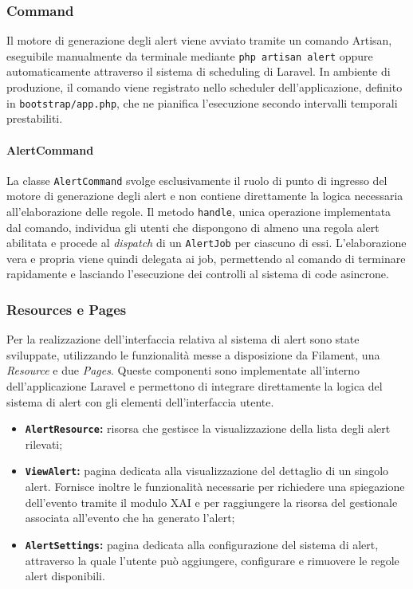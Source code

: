 \subsubsection{Command}
Il motore di generazione degli alert viene avviato tramite un comando Artisan, eseguibile manualmente da terminale mediante \texttt{php artisan alert} oppure 
automaticamente attraverso il sistema di scheduling di Laravel. In ambiente di produzione, il comando viene registrato nello scheduler dell'applicazione, definito in 
\texttt{bootstrap/app.php}, che ne pianifica l'esecuzione secondo intervalli temporali prestabiliti.

\paragraph{AlertCommand}
La classe \texttt{AlertCommand} svolge esclusivamente il ruolo di punto di ingresso del motore di generazione degli alert e non contiene direttamente la logica 
necessaria all'elaborazione delle regole.
\newline
Il metodo \texttt{handle}, unica operazione implementata dal comando, individua gli utenti che dispongono di almeno una regola alert abilitata e procede al \textit{dispatch} di 
un \texttt{AlertJob} per ciascuno di essi. L'elaborazione vera e propria viene quindi delegata ai job, permettendo al comando di terminare rapidamente e lasciando l'esecuzione 
dei controlli al sistema di code asincrone.

\subsubsection{Resources e Pages}
Per la realizzazione dell'interfaccia relativa al sistema di alert sono state sviluppate, utilizzando le funzionalità messe a disposizione da Filament, una 
\textit{Resource} e due \textit{Pages}. Queste componenti sono implementate all'interno dell'applicazione Laravel e permettono di integrare direttamente la logica del 
sistema di alert con gli elementi dell'interfaccia utente.
\begin{itemize}
  \item \textbf{\texttt{AlertResource}:} risorsa che gestisce la visualizzazione della lista degli alert rilevati;
  \item \textbf{\texttt{ViewAlert}:} pagina dedicata alla visualizzazione del dettaglio di un singolo alert. Fornisce inoltre le funzionalità necessarie per richiedere una 
    spiegazione dell'evento tramite il modulo XAI e per raggiungere la risorsa del gestionale associata all'evento che ha generato l'alert;
  \item \textbf{\texttt{AlertSettings}:} pagina dedicata alla configurazione del sistema di alert, attraverso la quale l'utente può aggiungere, configurare e rimuovere le regole 
    alert disponibili.
\end{itemize}

